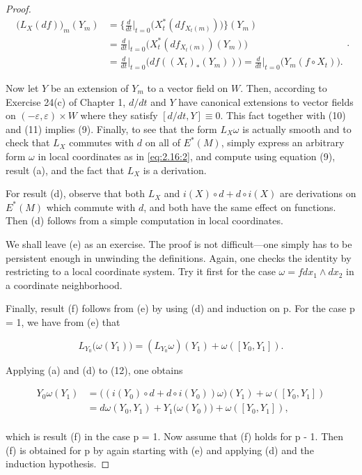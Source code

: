 \begin{proof}
\begin{equation}
\tag{11}\label{eq:2.25:11}
\begin{aligned}{\big(L_{X}(d f)\big)_{m}(Y_{m})}&{{}=\bigg\{\frac{d}{d t}\bigg|_{t=0}\big(X_{t}^{*}(d f_{X_{t}(m)})\big)\bigg\}(Y_{m})}\\ {}&{{}=\frac{d}{d t}\bigg|_{t=0}\big(X_{t}^{*}(d f_{X_{t}(m)})(Y_{m})\big)}\\ {}&{{}=\frac{d}{d t}\bigg|_{t=0}\big(d f((X_{t})_{*}(Y_{m}))\big)=\frac{d}{d t}\bigg|_{t=0}\big(Y_{m}(f\circ X_{t})\big).}\end{aligned}.
\end{equation}

Now let $Y$ be an extension of $Y_{m}$ to a vector field on $W$. Then, according to Exercise 24(c) of Chapter 1, $d/dt$ and $Y$ have canonical extensions to vector fields on $(-\varepsilon,\varepsilon)\times W$ where they satisfy $[d/dt,Y] \equiv 0$. This fact together with (10) and (11) implies (9). Finally, to see that the form $L_{X}\omega$ is actually smooth and to check that $L_{X}$ commutes with $d$ on all of $E^{*}(M)$, simply express an arbitrary form $\omega$ in local coordinates as in \eqref{eq:2.16:2}, and compute using equation (9), result (a), and the fact that $L_{X}$ is a derivation.

For result (d), observe that both $L_{X}$ and $i(X)\circ d+d\circ i(X)$ are derivations on $E^{*}(M)$ which commute with $d$, and both have the same effect on functions. Then (d) follows from a simple computation in local coordinates.

We shall leave (e) as an exercise. The proof is not difficult—one simply has to be persistent enough in unwinding the definitions. Again, one checks the identity by restricting to a local coordinate system. Try it first for the case  $ \omega = fdx_1 \wedge dx_2 $ in a coordinate neighborhood.

Finally, result (f) follows from (e) by using (d) and induction on p. For the case p = 1, we have from (e) that

\begin{equation}
\tag{12}\label{eq:2.25:12}
L_{Y_{0}}\big(\omega(Y_{1})\big)=(L_{Y_{0}}\omega)(Y_{1})+\omega([Y_{0},Y_{1}]).
\end{equation}

Applying (a) and (d) to (12), one obtains

\[
\begin{aligned}{Y_{0}\omega(Y_{1})}&{{}=\big((i(Y_{0})\circ d+d\circ i(Y_{0}))\omega\big)(Y_{1})+\omega([Y_{0},Y_{1}])}\\ {}&{{}=d\omega(Y_{0},Y_{1})+Y_{1}\big(\omega(Y_{0})\big)+\omega([Y_{0},Y_{1}]),}\\ \end{aligned}
\]

which is result (f) in the case p = 1. Now assume that (f) holds for p - 1. Then (f) is obtained for p by again starting with (e) and applying (d) and the induction hypothesis.

\end{proof}

